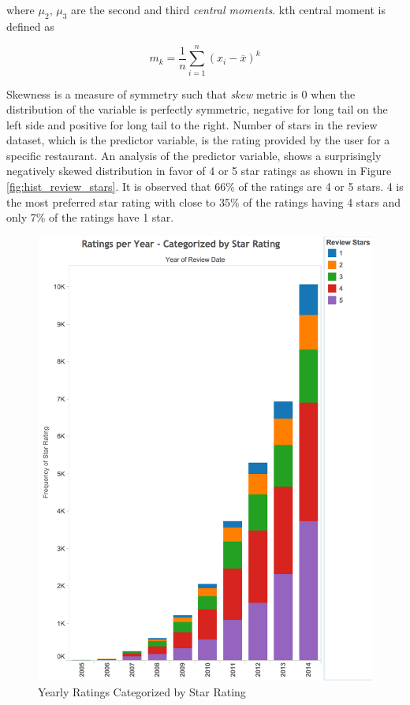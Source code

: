 \documentclass[12pt]{article}
\begin{document}
where $\mu_{2}$, $\mu_{3}$ are the second and third \textit{central moments}. kth central moment is defined as 

\begin{equation}
m_{k}=\frac{1}{n} \sum_{i=1}^n (x_{i} - \overline{x})^{k}
\end{equation}

Skewness is a measure of symmetry such that \textit{skew} metric is $0$ when the distribution of the variable is  perfectly symmetric, negative for long tail on the left side and positive for long tail to the right. Number of stars in the review dataset, which is the predictor variable, is the rating provided by the user for a specific restaurant. An analysis of the predictor variable, shows a surprisingly negatively skewed distribution in favor of 4 or 5 star ratings as shown in Figure \ref{fig:hist_review_stars}. It is observed that 66\% of the ratings are 4 or 5 stars. 4 is the most preferred star rating with close to 35\% of the ratings having 4 stars and only 7\% of the ratings have 1 star.

\begin{figure}[h]
\centering
\includegraphics[width=0.7\linewidth]{ratings_per_year_grouped_by_star}
\caption{Yearly Ratings Categorized by Star Rating}
\label{fig:ratings_per_year_grouped_by_star}
\end{figure}
\end{document}

